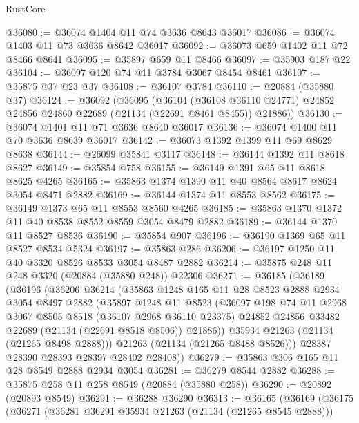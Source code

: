 \begin{lexlean}{RustCore}
\begin{coremodule}
@36080 := @36074 @1404 @11 @74 @3636 @8643 @36017
@36086 := @36074 @1403 @11 @73 @3636 @8642 @36017
@36092 := @36073 @659 @1402 @11 @72 @8466 @8641
@36095 := @35897 @659 @11 @8466
@36097 := @35903 @187 @22
@36104 := @36097 @120 @74 @11 @3784 @3067 @8454 @8461
@36107 := @35875 @37 @23 @37
@36108 := @36107 @3784
@36110 := @20884 (@35880 @37)
@36124 := @36092
    (@36095
      (@36104
        (@36108 @36110 @24771)
        @24852
        @24856
        @24860
        @22689
        (@21134 (@22691 @8461 @8455))
        @21886))
@36130 := @36074 @1401 @11 @71 @3636 @8640 @36017
@36136 := @36074 @1400 @11 @70 @3636 @8639 @36017
@36142 := @36073 @1392 @1399 @11 @69 @8629 @8638
@36144 := @26099 @35841 @3117
@36148 := @36144 @1392 @11 @8618 @8627
@36149 := @35854 @758
@36155 := @36149 @1391 @65 @11 @8618 @8625 @4265
@36165 := @35863 @1374 @1390 @11 @40 @8564 @8617 @8624 @3054 @8471 @2882
@36169 := @36144 @1374 @11 @8553 @8562
@36175 := @36149 @1373 @65 @11 @8553 @8560 @4265
@36185 := @35863 @1370 @1372 @11 @40 @8538 @8552 @8559 @3054 @8479 @2882
@36189 := @36144 @1370 @11 @8527 @8536
@36190 := @35854 @907
@36196 := @36190 @1369 @65 @11 @8527 @8534 @5324
@36197 := @35863 @286
@36206 := @36197 @1250 @11 @40 @3320 @8526 @8533 @3054 @8487 @2882
@36214 := @35875 @248 @11 @248 @3320 (@20884 (@35880 @248)) @22306
@36271 := @36185
    (@36189
      (@36196
        (@36206
          @36214
          (@35863
            @1248
            @165
            @11
            @28
            @8523
            @2888
            @2934
            @3054
            @8497
            @2882
            (@35897
              @1248
              @11
              @8523
              (@36097
                @198
                @74
                @11
                @2968
                @3067
                @8505
                @8518
                (@36107 @2968 @36110 @23375)
                @24852
                @24856
                @33482
                @22689
                (@21134 (@22691 @8518 @8506))
                @21886))
            @35934
            @21263
            (@21134 (@21265 @8498 @2888)))
          @21263
          (@21134 (@21265 @8488 @8526)))
        @28387
        @28390
        @28393
        @28397
        @28402
        @28408))
@36279 := @35863 @306 @165 @11 @28 @8549 @2888 @2934 @3054
@36281 := @36279 @8544 @2882
@36288 := @35875 @258 @11 @258 @8549 (@20884 (@35880 @258))
@36290 := @20892 (@20893 @8549)
@36291 := @36288 @36290
@36313 := @36165
    (@36169
      (@36175
        (@36271
          (@36281 @36291 @35934 @21263 (@21134 (@21265 @8545 @2888)))

\end{coremodule}
\end{lexlean}
